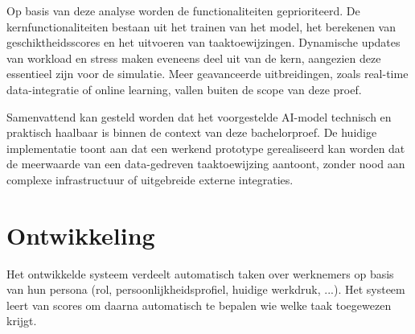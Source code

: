 Op basis van deze analyse worden de functionaliteiten geprioriteerd. De kernfunctionaliteiten bestaan uit het trainen van het model, het berekenen van geschiktheidsscores en het uitvoeren van taaktoewijzingen. Dynamische updates van workload en stress maken eveneens deel uit van de kern, aangezien deze essentieel zijn voor de simulatie. Meer geavanceerde uitbreidingen, zoals real-time data-integratie of online learning, vallen buiten de scope van deze proef.

\vspace{1em}Samenvattend kan gesteld worden dat het voorgestelde AI-model technisch en praktisch haalbaar is binnen de context van deze bachelorproef. De huidige implementatie toont aan dat een werkend prototype gerealiseerd kan worden dat de meerwaarde van een data-gedreven taaktoewijzing aantoont, zonder nood aan complexe infrastructuur of uitgebreide externe integraties.
\section{Ontwikkeling}
\label{ch:ontwikkeling}





\vspace{1em}Het ontwikkelde systeem verdeelt automatisch taken over werknemers op basis van hun persona (rol, persoonlijkheidsprofiel, huidige werkdruk, ...). Het systeem leert van scores om daarna automatisch te bepalen wie welke taak toegewezen krijgt.

